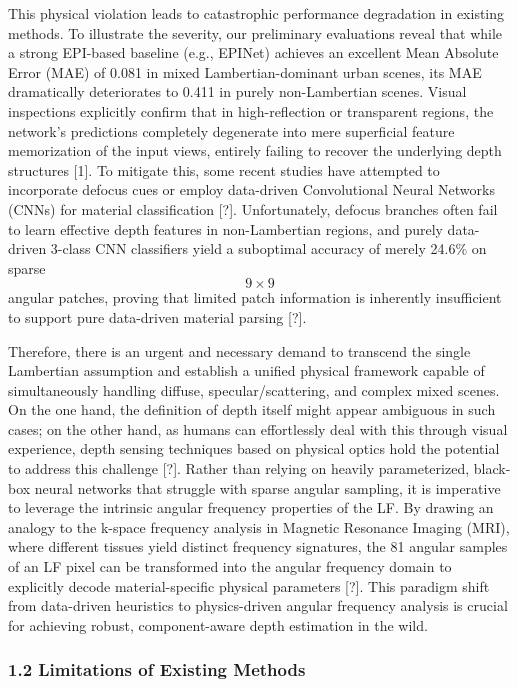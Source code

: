 This physical violation leads to catastrophic performance degradation in existing methods. To illustrate the severity, our preliminary evaluations reveal that while a strong EPI-based baseline (e.g., EPINet) achieves an excellent Mean Absolute Error (MAE) of 0.081 in mixed Lambertian-dominant urban scenes, its MAE dramatically deteriorates to 0.411 in purely non-Lambertian scenes. Visual inspections explicitly confirm that in high-reflection or transparent regions, the network's predictions completely degenerate into mere superficial feature memorization of the input views, entirely failing to recover the underlying depth structures [1]. To mitigate this, some recent studies have attempted to incorporate defocus cues or employ data-driven Convolutional Neural Networks (CNNs) for material classification [?]. Unfortunately, defocus branches often fail to learn effective depth features in non-Lambertian regions, and purely data-driven 3-class CNN classifiers yield a suboptimal accuracy of merely 24.6\% on sparse \[
9 \times 9
\] angular patches, proving that limited patch information is inherently insufficient to support pure data-driven material parsing [?].

Therefore, there is an urgent and necessary demand to transcend the single Lambertian assumption and establish a unified physical framework capable of simultaneously handling diffuse, specular/scattering, and complex mixed scenes. On the one hand, the definition of depth itself might appear ambiguous in such cases; on the other hand, as humans can effortlessly deal with this through visual experience, depth sensing techniques based on physical optics hold the potential to address this challenge [?]. Rather than relying on heavily parameterized, black-box neural networks that struggle with sparse angular sampling, it is imperative to leverage the intrinsic angular frequency properties of the LF. By drawing an analogy to the k-space frequency analysis in Magnetic Resonance Imaging (MRI), where different tissues yield distinct frequency signatures, the 81 angular samples of an LF pixel can be transformed into the angular frequency domain to explicitly decode material-specific physical parameters [?]. This paradigm shift from data-driven heuristics to physics-driven angular frequency analysis is crucial for achieving robust, component-aware depth estimation in the wild.

\subsubsection{1.2 Limitations of Existing Methods}

